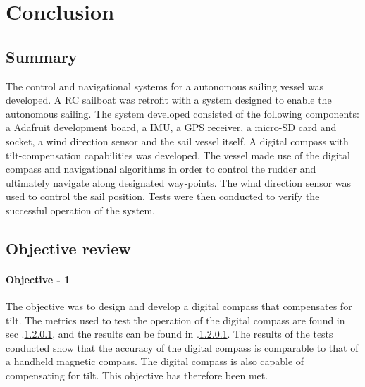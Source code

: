 \graphicspath{{conclusion/fig/}}

\chapter{Conclusion}
\label{chap:conclusion}

\section{Summary}
The control and navigational systems for a autonomous sailing vessel was developed. A RC sailboat was retrofit with a system designed to enable the autonomous sailing. The system developed consisted
of the following components: a Adafruit development board, a IMU, a GPS receiver, a micro-SD card and socket, a wind direction sensor and the sail vessel itself. A digital compass with tilt-compensation
capabilities was developed. The vessel made use of the digital compass and navigational algorithms in order to control the rudder and ultimately navigate along designated way-points. The wind direction
sensor was used to control the sail position. Tests were then conducted to verify the successful operation of the system.

\section{Objective review}

\subsubsection{Objective - 1}
The objective was to design and develop a digital compass that compensates for tilt. The metrics used to test the operation of the digital compass are found in sec .\ref{},
and the results can be found in .\ref{}. The results of the tests conducted show that the accuracy of the digital compass is comparable to that of a handheld
magnetic compass. The digital compass is also capable of compensating for tilt. This objective has therefore been met.

